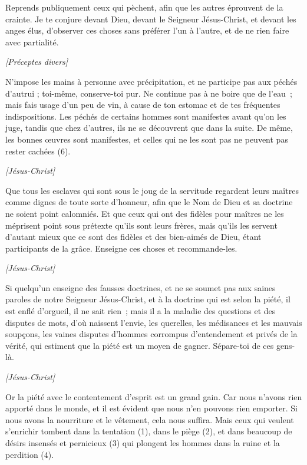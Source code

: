 \begin{multicols}{2}
Reprends publiquement ceux qui pèchent, afin que les autres éprouvent de la crainte.
Je te conjure devant Dieu, devant le Seigneur Jésus-Christ, et devant les anges élus, d’observer ces choses sans préférer l'un à l'autre, et de ne rien faire avec partialité.
\begin{center}
\textit{[Préceptes divers]}
\end{center}
\PPE{}
N'impose les mains à personne avec précipitation, et ne participe pas aux péchés d'autrui ; toi-même, conserve-toi pur.
Ne continue pas à ne boire que de l’eau ; mais fais usage d’un peu de vin, à cause de ton estomac et de tes fréquentes indispositions.
Les péchés de certains hommes sont manifestes avant qu’on les juge, tandis que chez d’autres, ils ne se découvrent que dans la suite.
De même, les bonnes œuvres sont manifestes, et celles qui ne les sont pas ne peuvent pas rester cachées (6).
\begin{center}
\textit{[Jésus-Christ]}
\end{center}
\VerseOne{}Que tous les esclaves qui sont sous le joug de la servitude regardent leurs maîtres comme dignes de toute sorte d'honneur, afin que le Nom de Dieu et sa doctrine ne soient point calomniés.
Et que ceux qui ont des fidèles pour maîtres ne les méprisent point sous prétexte qu'ils sont leurs frères, mais qu’ils les servent d’autant mieux que ce sont des fidèles et des bien-aimés de Dieu, étant participants de la grâce. Enseigne ces choses et recommande-les.
\begin{center}
\textit{[Jésus-Christ]}
\end{center}
\PPE{}
Si quelqu'un enseigne des fausses doctrines, et ne se soumet pas aux saines paroles de notre Seigneur Jésus-Christ, et à la doctrine qui est selon la piété,
il est enflé d'orgueil, il ne sait rien ; mais il a la maladie des questions et des disputes de mots, d'où naissent l’envie, les querelles, les médisances et les mauvais soupçons,
les vaines disputes d'hommes corrompus d'entendement et privés de la vérité, qui estiment que la piété est un moyen de gagner. Sépare-toi de ces gens-là.
\begin{center}
\textit{[Jésus-Christ]}
\end{center}
\PPE{}
Or la piété avec le contentement d'esprit est un grand gain.
Car nous n'avons rien apporté dans le monde, et il est évident que nous n'en pouvons rien emporter.
Si nous avons la nourriture et le vêtement, cela nous suffira.
Mais ceux qui veulent s’enrichir tombent dans la tentation (1), dans le piège (2), et dans beaucoup de désirs insensés et pernicieux (3) qui plongent les hommes dans la ruine et la perdition (4).

\end{multicols}
